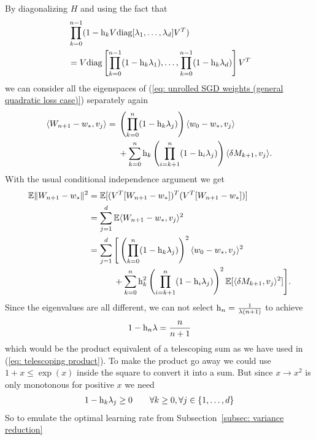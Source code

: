 By diagonalizing \(H\) and using the fact that
\begin{align*}
	&\prod_{k=0}^{n-1} (1-\text{h}_k V\text{diag}[\lambda_1, \dots, \lambda_d]V^T)\\
	&= V \text{diag}\left[
		\prod_{k=0}^{n-1}(1-\text{h}_k\lambda_1),
		\dots, \prod_{k=0}^{n-1}(1-\text{h}_k\lambda_d)
	\right]V^T
\end{align*}
we can consider all the eigenspaces of (\ref{eq: unrolled SGD weights (general
quadratic loss case)}) separately again
\begin{align*}
	\langle W_{n+1}-w_*, v_j \rangle
	= \begin{aligned}[t]
		&\left(\prod_{k=0}^n(1-\text{h}_k\lambda_j)\right) \langle w_0-w_*, v_j\rangle\\
		&+ \sum_{k=0}^n \text{h}_k \left(\prod_{i=k+1}^n(1-\text{h}_i\lambda_j)\right)\langle\delta M_{k+1},v_j\rangle.
	\end{aligned}
\end{align*}
With the usual conditional independence argument we get
\begin{align*}
	\mathbb{E}\|W_{n+1}-w_*\|^2
	&= \mathbb{E}[(V^T [W_{n+1}-w_*])^T(V^T[W_{n+1}-w_*])]\\
	&= \sum_{j=1}^d \mathbb{E}\langle W_{n+1}-w_*, v_j \rangle^2\\
	&= \sum_{j=1}^d
	\begin{aligned}[t]
		&\Bigg[\left(\prod_{k=0}^n(1-\text{h}_k\lambda_j)\right)^2 \langle w_0-w_*, v_j\rangle^2\\
		&+ \sum_{k=0}^n \text{h}_k^2 \left(\prod_{i=k+1}^n(1-\text{h}_i\lambda_j)\right)^2\mathbb{E}[\langle\delta M_{k+1},v_j\rangle^2]\Bigg].
	\end{aligned}
\end{align*}
Since the eigenvalues are all different, we can not select \(\text{h}_n=\frac{1}{\lambda(n+1)}\)
to achieve
\begin{align*}
	1-\text{h}_n\lambda = \frac{n}{n+1}
\end{align*}
which would be the product equivalent of a telescoping sum as we have used in
(\ref{eq: telescoping product}). To make the product go away we could use
\(1+x\le \exp(x)\) inside the square to convert it into a sum. But since \(x\to
x^2\) is only monotonous for positive \(x\) we need
\begin{align*}
	1-\text{h}_k \lambda_j \ge 0 \qquad \forall k\ge 0, \forall j \in\{1,\dots,d\}
\end{align*}
So to emulate the optimal learning rate from Subsection~\ref{subsec: variance reduction}
